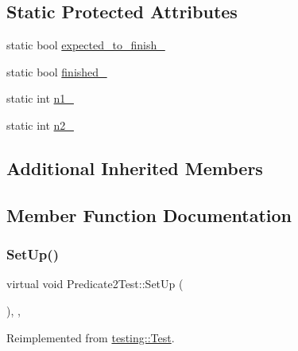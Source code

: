 \subsection*{Static Protected Attributes}
\begin{DoxyCompactItemize}
\item 
static bool \hyperlink{class_predicate2_test_a56cf1f0f556addd9a62e0644dc1a86fc}{expected\+\_\+to\+\_\+finish\+\_\+}
\item 
static bool \hyperlink{class_predicate2_test_a30f4ef76d3004253078e767e5c653b85}{finished\+\_\+}
\item 
static int \hyperlink{class_predicate2_test_ac002d8e279b24e75906fd19973fc2170}{n1\+\_\+}
\item 
static int \hyperlink{class_predicate2_test_a9dbe5173570b9b911af2df889c287027}{n2\+\_\+}
\end{DoxyCompactItemize}
\subsection*{Additional Inherited Members}


\subsection{Member Function Documentation}
\mbox{\label{class_predicate2_test_a9778563daf4846327d32061c1a8ccba0}} 
\subsubsection{\texorpdfstring{Set\+Up()}{SetUp()}}
{\footnotesize\ttfamily virtual void Predicate2\+Test\+::\+Set\+Up (\begin{DoxyParamCaption}{ }\end{DoxyParamCaption})\hspace{0.3cm}{\ttfamily [inline]}, {\ttfamily [protected]}, {\ttfamily [virtual]}}



Reimplemented from \hyperlink{classtesting_1_1_test_a190315150c303ddf801313fd1a777733}{testing\+::\+Test}.

\mbox{\label{class_predicate2_test_a7379f8f7772af6b4c76edcc90b6aaaeb}} 
